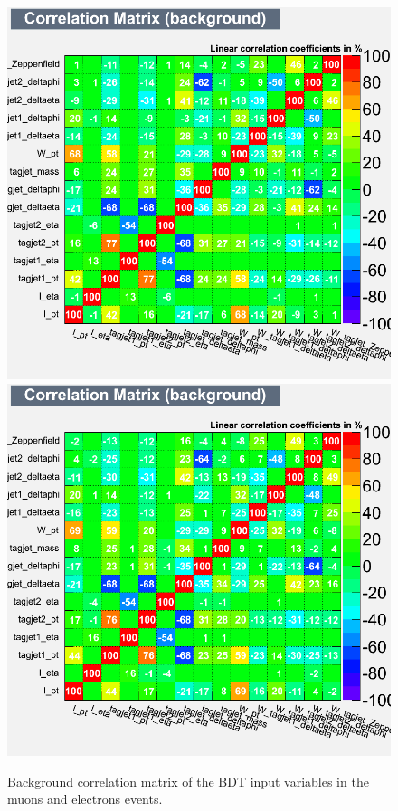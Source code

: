 \begin{figure}[ht]
\centerline{
\includegraphics[width=.49\textwidth]{figs/bdtoutput/EWKW2jets_mu_0to100_BDT_traning2_lite_mjj_300root_CorrelationMatrixB.png}
\includegraphics[width=.49\textwidth]{figs/bdtoutput/EWKW2jets_el_0to100_BDT_traning2_lite_mjj_300root_CorrelationMatrixB.png}
}
\caption{Background correlation matrix of the BDT input variables in the muons and electrons events.}
\label{fig:correlation_matrix}
\end{figure}

